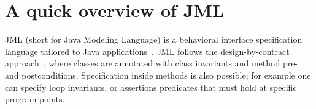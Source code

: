 


\section{A quick overview of JML} \label{prelim}
JML (short for Java Modeling Language) is a behavioral interface specification language tailored to Java applications~\cite{JMLRefMan}. JML 
follows the design-by-contract approach~\cite{M97oos}, where classes are annotated with class invariants and method pre- and postconditions. Specification
inside methods is also possible; for example one can specify loop invariants, or assertions  predicates that must hold at specific program points. 

